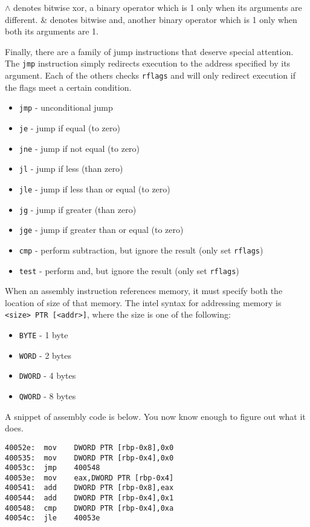 \begin{aside}
    $\wedge$ denotes bitwise xor, a binary operator which is 1 only when its
    arguments are different. \& denotes bitwise and, another binary operator
    which is 1 only when both its arguments are 1.
\end{aside}

Finally, there are a family of jump instructions that deserve special attention.
The \texttt{jmp} instruction simply redirects execution to the address specified
by its argument. Each of the others checks \texttt{rflags} and will only
redirect execution if the flags meet a certain condition.

\begin{itemize}
    \item \texttt{jmp} - unconditional jump
    \item \texttt{je} - jump if equal (to zero)
    \item \texttt{jne} - jump if not equal (to zero)
    \item \texttt{jl} - jump if less (than zero)
    \item \texttt{jle} - jump if less than or equal (to zero)
    \item \texttt{jg} - jump if greater (than zero)
    \item \texttt{jge} - jump if greater than or equal (to zero)
    \item \texttt{cmp} - perform subtraction, but ignore the result (only set
        \texttt{rflags})
    \item \texttt{test} - perform and, but ignore the result (only set
        \texttt{rflags})
\end{itemize}

When an assembly instruction references memory, it must specify both the
location of size of that memory. The intel syntax for addressing memory is
\texttt{<size> PTR [<addr>]}, where the size is one of the following:
\begin{itemize}
    \item \texttt{BYTE} - 1 byte
    \item \texttt{WORD} - 2 bytes
    \item \texttt{DWORD} - 4 bytes
    \item \texttt{QWORD} - 8 bytes
\end{itemize}

A snippet of assembly code is below. You now know enough to figure out what it
does.

\begin{lstlisting}
40052e:  mov    DWORD PTR [rbp-0x8],0x0
400535:  mov    DWORD PTR [rbp-0x4],0x0
40053c:  jmp    400548
40053e:  mov    eax,DWORD PTR [rbp-0x4]
400541:  add    DWORD PTR [rbp-0x8],eax
400544:  add    DWORD PTR [rbp-0x4],0x1
400548:  cmp    DWORD PTR [rbp-0x4],0xa
40054c:  jle    40053e
\end{lstlisting}

